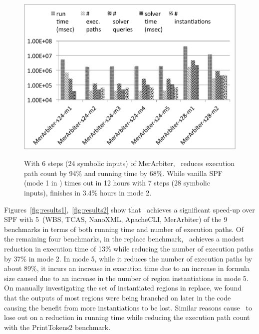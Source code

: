 \begin{figure}
    {\includegraphics[width=\columnwidth]{figures/merarbiter-results.pdf} }
    \label{fig:merarbiter-results}%
    \caption{With 6 steps (24 symbolic inputs) of MerArbiter, \tool\ reduces execution path count by 94\% and running time by 68\%. While
    vanilla SPF (mode 1 in \tool) times out in 12 hours with 7 steps (28 symbolic inputs), \tool finishes in 3.4\% hours
    in mode 2.}
\end{figure}

Figures~\ref{fig:results1},~\ref{fig:results2} show that \tool\ achieves a significant speed-up over SPF with
5~(WBS, TCAS, NanoXML, ApacheCLI, MerArbiter) of the 9 benchmarks in terms of both running time and number of
execution paths.
%
Of the remaining four benchmarks, in the replace benchmark, \tool\ achieves a modest reduction in execution time
of 13\% while reducing the number of execution paths by 37\% in mode 2.
%
In mode 5, while it reduces the number of execution paths by about 89\%, it incurs an increase in execution time due to
an increase in formula size caused due to an increase in the number of region instantiations in mode 5.
%
On manually investigating the set of instantiated regions in replace, we found that the outputs of most regions were
being branched on later in the code causing the benefit from more instantiations to be lost.
%
Similar reasons cause \tool\ to lose out on a reduction in running time while reducing the execution path
count with the PrintTokens2 benchmark.

